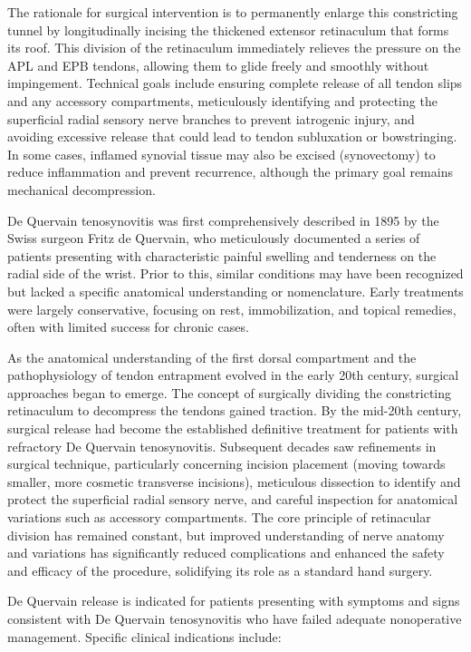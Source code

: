 The rationale for surgical intervention is to permanently enlarge this constricting tunnel by longitudinally incising the thickened extensor retinaculum that forms its roof. This division of the retinaculum immediately relieves the pressure on the APL and EPB tendons, allowing them to glide freely and smoothly without impingement. Technical goals include ensuring complete release of all tendon slips and any accessory compartments, meticulously identifying and protecting the superficial radial sensory nerve branches to prevent iatrogenic injury, and avoiding excessive release that could lead to tendon subluxation or bowstringing. In some cases, inflamed synovial tissue may also be excised (synovectomy) to reduce inflammation and prevent recurrence, although the primary goal remains mechanical decompression.

De Quervain tenosynovitis was first comprehensively described in 1895 by the Swiss surgeon Fritz de Quervain, who meticulously documented a series of patients presenting with characteristic painful swelling and tenderness on the radial side of the wrist. Prior to this, similar conditions may have been recognized but lacked a specific anatomical understanding or nomenclature. Early treatments were largely conservative, focusing on rest, immobilization, and topical remedies, often with limited success for chronic cases.

As the anatomical understanding of the first dorsal compartment and the pathophysiology of tendon entrapment evolved in the early 20th century, surgical approaches began to emerge. The concept of surgically dividing the constricting retinaculum to decompress the tendons gained traction. By the mid-20th century, surgical release had become the established definitive treatment for patients with refractory De Quervain tenosynovitis. Subsequent decades saw refinements in surgical technique, particularly concerning incision placement (moving towards smaller, more cosmetic transverse incisions), meticulous dissection to identify and protect the superficial radial sensory nerve, and careful inspection for anatomical variations such as accessory compartments. The core principle of retinacular division has remained constant, but improved understanding of nerve anatomy and variations has significantly reduced complications and enhanced the safety and efficacy of the procedure, solidifying its role as a standard hand surgery.

De Quervain release is indicated for patients presenting with symptoms and signs consistent with De Quervain tenosynovitis who have failed adequate nonoperative management. Specific clinical indications include:

